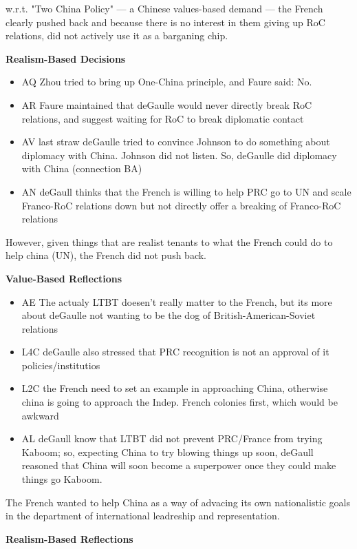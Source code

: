 \documentclass[letterpaper]{article}
\begin{document}
\begin{enumerate}
w.r.t. "Two China Policy" --- a Chinese values-based demand --- the
French clearly pushed back and because there is no interest in them
giving up RoC relations, did not actively use it as a barganing chip.

\textbf{Realism-Based Decisions}

\begin{itemize}
\item AQ Zhou tried to bring up One-China principle, and Faure said: No.
\item AR Faure maintained that deGaulle would never directly break RoC
relations, and suggest waiting for RoC to break diplomatic contact
\item AV last straw deGaulle tried to convince Johnson to do something about
diplomacy with China. Johnson did not listen. So, deGaulle did
diplomacy with China (connection BA)
\item AN deGaull thinks that the French is willing to help PRC go to UN and
scale Franco-RoC relations down but not directly offer a breaking of
Franco-RoC relations
\end{itemize}

However, given things that are realist tenants to what the French could
do to help china (UN), the French did not push back.

\textbf{Value-Based Reflections}

\begin{itemize}
\item AE The actualy LTBT doesen't really matter to the French, but its more
about deGaulle not wanting to be the dog of British-American-Soviet
relations
\item L4C deGaulle also stressed that PRC recognition is not an approval of
it policies/institutios
\item L2C the French need to set an example in approaching China, otherwise
china is going to approach the Indep. French colonies first, which
would be awkward
\item AL deGaull know that LTBT did not prevent PRC/France from trying
Kaboom; so, expecting China to try blowing things up soon, deGaull
reasoned that China will soon become a superpower once they could make
things go Kaboom.
\end{itemize}

The French wanted to help China as a way of advacing its own
nationalistic goals in the department of international leadreship and
representation.

\textbf{Realism-Based Reflections}


\end{enumerate}
\end{document}
